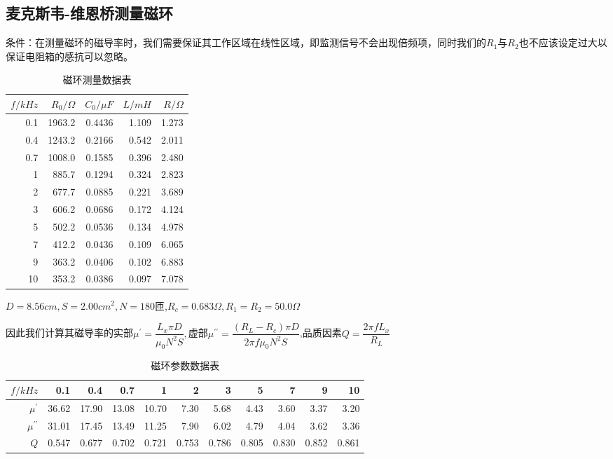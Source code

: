 \documentclass[UTF8]{ctexart}
\begin{document}
	\subsection{麦克斯韦-维恩桥测量磁环}
	条件：在测量磁环的磁导率时，我们需要保证其工作区域在线性区域，即监测信号不会出现倍频项，同时我们的$R_{1}$与$R_{2}$也不应该设定过大以保证电阻箱的感抗可以忽略。
	\begin{table}[H]
		\centering
		\caption{磁环测量数据表}
		\label{磁环测量数据表}
		\begin{tabular}{|r|r|r|r|r|}
			\toprule[0.5mm]
			$f/kHz$&$R_{0}/\Omega$&$C_{0}/\mu F$&$L/mH$&$R/\Omega$\\
			\midrule
			0.1&1963.2&0.4436&1.109&1.273\\
			0.4&1243.2&0.2166&0.542&2.011\\
			0.7&1008.0&0.1585&0.396&2.480\\
			1&885.7&0.1294&0.324&2.823\\
			2&677.7&0.0885&0.221&3.689\\
			3&606.2&0.0686&0.172&4.124\\
			5&502.2&0.0536&0.134&4.978\\
			7&412.2&0.0436&0.109&6.065\\
			9&363.2&0.0406&0.102&6.883\\
			10&353.2&0.0386&0.097&7.078\\
			\bottomrule[0.5mm]
		\end{tabular}
	\end{table}
	\par $D=8.56cm,S=2.00cm^{2},N=180$匝,$R_{c}=0.683\Omega,R_{1}=R_{2}=50.0\Omega$
	\par 因此我们计算其磁导率的实部$\mu^{\prime}=\dfrac{L_{x}\pi D}{\mu_{0}N^{2}S},$虚部$\mu^{\prime\prime}=\dfrac{(R_{L}-R_{c})\pi D}{2\pi f\mu_{0}N^{2}S}$,品质因素$Q=\dfrac{2\pi fL_{x}}{R_{L}}$
	\begin{table}[H]
		\centering
		\caption{磁环参数数据表}
		\label{磁环参数数据表}
		\begin{tabular}{|r|r|r|r|r|r|r|r|r|r|r|}
			\toprule[0.5mm]
			$f/kHz$&0.1&0.4&0.7&1&2&3&5&7&9&10\\
			\midrule
			$\mu^{\prime}$&36.62&17.90&13.08&10.70&7.30&5.68&4.43&3.60&3.37&3.20\\
			$\mu^{\prime\prime}$&31.01&17.45&13.49&11.25&7.90&6.02&4.79&4.04&3.62&3.36\\
			$Q$&0.547&0.677&0.702&0.721&0.753&0.786&0.805&0.830&0.852&0.861\\
			\bottomrule[0.5mm]
		\end{tabular}
	\end{table}
\end{document}
